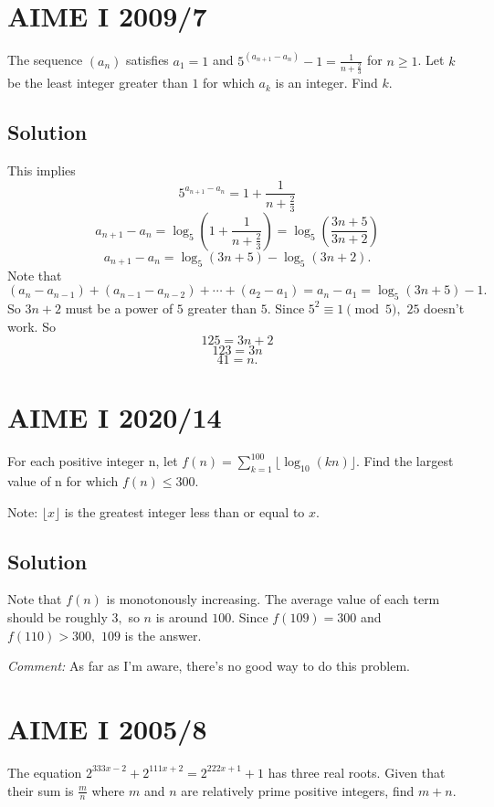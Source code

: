 \documentclass[blue,onecol]{shooting}
\begin{document}
\section{AIME I 2009/7}

The sequence $(a_n)$ satisfies $a_1 = 1$ and $5^{(a_{n + 1} - a_n)} - 1 = \frac {1}{n + \frac {2}{3}}$ for $n \geq 1$. Let $k$ be the least integer greater than $1$ for which $a_k$ is an integer. Find $k$.

\subsection{Solution}

This implies
    \[5^{a_{n+1}-a_n}=1+\frac{1}{n+\frac{2}{3}}\]
    \[a_{n+1}-a_n=\log_5(1+\frac{1}{n+\frac{2}{3}})=\log_5(\frac{3n+5}{3n+2})\]
    \[a_{n+1}-a_n=\log_5(3n+5)-\log_5(3n+2).\]
    Note that $(a_{n}-a_{n-1})+(a_{n-1}-a_{n-2})+\cdots+(a_{2}-a_{1})=a_n-a_1=\log_5(3n+5)-1.$ So $3n+2$ must be a power of $5$ greater than $5.$ Since $5^2\equiv 1\pmod{5},$ $25$ doesn't work. So
    \[125=3n+2\]
    \[123=3n\]
    \[41=n.\]

\section{AIME I 2020/14}

For each positive integer n, let $f(n) = \sum_{k = 1}^{100} \lfloor \log_{10} (kn) \rfloor$. Find the largest value of n for which $f(n) \le 300$.

Note: $\lfloor x \rfloor$ is the greatest integer less than or equal to $x$.

\subsection{Solution}

Note that $f(n)$ is monotonously increasing. The average value of each term should be roughly $3,$ so $n$ is around $100.$ Since $f(109)=300$ and $f(110)>300,$ $109$ is the answer.

\textit{Comment:} As far as I'm aware, there's no good way to do this problem.

\section{AIME I 2005/8}

The equation $2^{333x-2} + 2^{111x+2} = 2^{222x+1} + 1$ has three real roots. Given that their sum is $\frac mn$ where $m$ and $n$ are relatively prime positive integers, find $m+n.$
\end{document}
